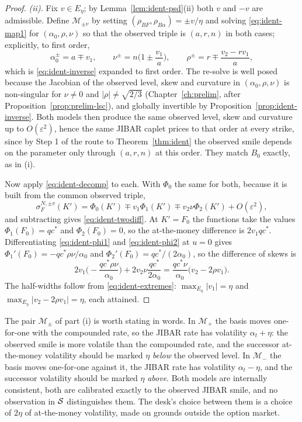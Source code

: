 \documentclass[../../../main.tex]{subfiles}
\begin{document}
\begin{proof}
\emph{(ii).} Fix $v\in E_\eta$; by Lemma~\ref{lem:ident-psd}(ii) both $v$ and $-v$ are admissible. Define $\mathcal M_{\pm v}$ by setting $(\rho_{BF},\rho_{B\alpha})=\pm v/\eta$ and solving \eqref{eq:ident-map1} for $(\alpha_0,\rho,\nu)$ so that the observed triple is $(a,r,n)$ in both cases; explicitly, to first order,
\[
\alpha_0^{\pm}=a\mp v_1,\qquad \nu^{\pm}=n\Big(1\pm\frac{v_1}{a}\Big),\qquad \rho^{\pm}=r\mp\frac{v_2-rv_1}{a},
\]
which is \eqref{eq:ident-inverse} expanded to first order. The re-solve is well posed because the Jacobian of the observed level, skew and curvature in $(\alpha_0,\rho,\nu)$ is non-singular for $\nu\neq0$ and $|\rho|\neq\sqrt{2/3}$ (Chapter~\ref{ch:prelim}, after Proposition~\ref{prop:prelim-lsc}), and globally invertible by Proposition~\ref{prop:ident-inverse}. Both models then produce the same observed level, skew and curvature up to $O(\varepsilon^2)$, hence the same JIBAR caplet prices to that order at every strike, since by Step 1 of the route to Theorem~\ref{thm:ident} the observed smile depends on the parameter only through $(a,r,n)$ at this order. They match $B_0$ exactly, as in (i).

Now apply \eqref{eq:ident-decomp} to each. With $\Phi_0$ the same for both, because it is built from the common observed triple,
\[
\sigma^{N,\pm v}_F(K')=\Phi_0(K')\mp v_1\Phi_1(K')\mp v_2\nu\Phi_2(K')+O(\varepsilon^2),
\]
and subtracting gives \eqref{eq:ident-twodiff}. At $K'=F_0$ the functions take the values $\Phi_1(F_0)=qc^*$ and $\Phi_2(F_0)=0$, so the at-the-money difference is $2v_1qc^*$. Differentiating \eqref{eq:ident-phi1} and \eqref{eq:ident-phi2} at $u=0$ gives $\Phi_1'(F_0)=-qc^*\rho\nu/\alpha_0$ and $\Phi_2'(F_0)=qc^*/(2\alpha_0)$, so the difference of skews is
\[
2v_1\Big(-\frac{qc^*\rho\nu}{\alpha_0}\Big)+2v_2\nu\frac{qc^*}{2\alpha_0}=\frac{qc^*\nu}{\alpha_0}\big(v_2-2\rho v_1\big).
\]
The half-widths follow from \eqref{eq:ident-extremes}: $\max_{E_\eta}|v_1|=\eta$ and $\max_{E_\eta}|v_2-2\rho v_1|=\eta$, each attained.

\end{proof}

\begin{remark}\label{rem:ident-reading-two}
The pair $\mathcal M_\pm$ of part (i) is worth stating in words. In $\mathcal M_+$ the basis moves one-for-one with the compounded rate, so the JIBAR rate has volatility $\alpha_t+\eta$: the observed smile is more volatile than the compounded rate, and the successor at-the-money volatility should be marked $\eta$ \emph{below} the observed level. In $\mathcal M_-$ the basis moves one-for-one against it, the JIBAR rate has volatility $\alpha_t-\eta$, and the successor volatility should be marked $\eta$ \emph{above}. Both models are internally consistent, both are calibrated exactly to the observed JIBAR smile, and no observation in $\mathcal S$ distinguishes them. The desk's choice between them is a choice of $2\eta$ of at-the-money volatility, made on grounds outside the option market.
\end{remark}
\end{document}

